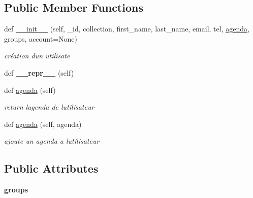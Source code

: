 \subsection*{Public Member Functions}
\begin{DoxyCompactItemize}
\item 
\mbox{\label{classSource_1_1core_1_1user_1_1User_a8d29da6a2ae1876c27166f3faf2dc1c6}} 
def \mbox{\hyperlink{classSource_1_1core_1_1user_1_1User_a8d29da6a2ae1876c27166f3faf2dc1c6}{\+\_\+\+\_\+init\+\_\+\+\_\+}} (self, \+\_\+id, collection, first\+\_\+name, last\+\_\+name, email, tel, \mbox{\hyperlink{classSource_1_1core_1_1user_1_1User_aca59c238ba182f8409f6c9c37b3b9e9b}{agenda}}, groups, account=None)
\begin{DoxyCompactList}\small\item\em création d\textquotesingle{}un utilisate \end{DoxyCompactList}\item 
\mbox{\label{classSource_1_1core_1_1user_1_1User_a73a5a2e042cce83c61bf3b10ebb0db6c}} 
def {\bfseries \+\_\+\+\_\+repr\+\_\+\+\_\+} (self)
\item 
\mbox{\label{classSource_1_1core_1_1user_1_1User_aca59c238ba182f8409f6c9c37b3b9e9b}} 
def \mbox{\hyperlink{classSource_1_1core_1_1user_1_1User_aca59c238ba182f8409f6c9c37b3b9e9b}{agenda}} (self)
\begin{DoxyCompactList}\small\item\em return l\textquotesingle{}agenda de l\textquotesingle{}utilisateur \end{DoxyCompactList}\item 
\mbox{\label{classSource_1_1core_1_1user_1_1User_adb8f3bf9d2a6d22f62bafd75706f7d91}} 
def \mbox{\hyperlink{classSource_1_1core_1_1user_1_1User_adb8f3bf9d2a6d22f62bafd75706f7d91}{agenda}} (self, agenda)
\begin{DoxyCompactList}\small\item\em ajoute un agenda a l\textquotesingle{}utilisateur \end{DoxyCompactList}\end{DoxyCompactItemize}
\subsection*{Public Attributes}
\begin{DoxyCompactItemize}
\item 
\mbox{\label{classSource_1_1core_1_1user_1_1User_a96e991e12844b15b5d3768fda52730d3}} 
{\bfseries groups}
\end{DoxyCompactItemize}
